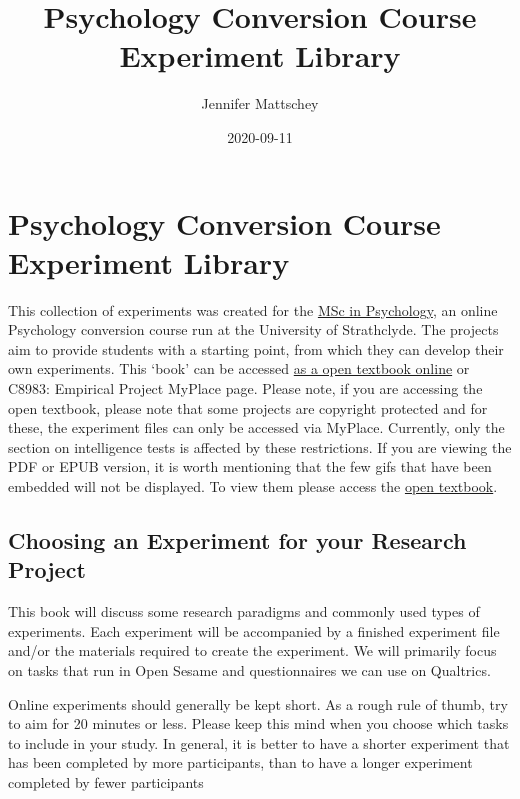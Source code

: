 \documentclass[
]{book}
\title{Psychology Conversion Course Experiment Library}
\author{Jennifer Mattschey}
\date{2020-09-11}
\begin{document}
\maketitle

{
\setcounter{tocdepth}{1}
\tableofcontents
}
\hypertarget{psychology-conversion-course-experiment-library}{%
\chapter{Psychology Conversion Course Experiment Library}\label{psychology-conversion-course-experiment-library}}

This collection of experiments was created for the \href{https://www.strath.ac.uk/courses/postgraduatetaught/psychologywithaspecialisationinbusiness}{MSc in Psychology}, an online Psychology conversion course run at the University of Strathclyde. The projects aim to provide students with a starting point, from which they can develop their own experiments. This `book' can be accessed \href{https://jmattschey.github.io/MScConversionExperiments}{as a open textbook online} or C8983: Empirical Project MyPlace page. Please note, if you are accessing the open textbook, please note that some projects are copyright protected and for these, the experiment files can only be accessed via MyPlace. Currently, only the section on intelligence tests is affected by these restrictions. If you are viewing the PDF or EPUB version, it is worth mentioning that the few gifs that have been embedded will not be displayed. To view them please access the \href{https://jmattschey.github.io/MScConversionExperiments}{open textbook}.

\hypertarget{choosing-an-experiment-for-your-research-project}{%
\section{Choosing an Experiment for your Research Project}\label{choosing-an-experiment-for-your-research-project}}

This book will discuss some research paradigms and commonly used types of experiments. Each experiment will be accompanied by a finished experiment file and/or the materials required to create the experiment. We will primarily focus on tasks that run in Open Sesame and questionnaires we can use on Qualtrics.

Online experiments should generally be kept short. As a rough rule of thumb, try to aim for 20 minutes or less. Please keep this mind when you choose which tasks to include in your study. In general, it is better to have a shorter experiment that has been completed by more participants, than to have a longer experiment completed by fewer participants
\end{document}
